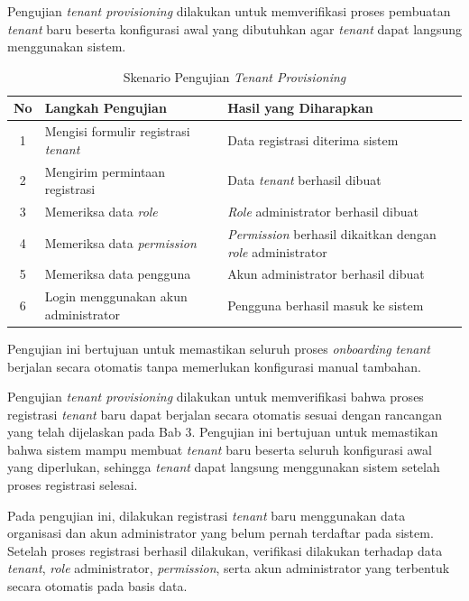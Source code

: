 Pengujian \textit{tenant provisioning} dilakukan untuk memverifikasi proses pembuatan \textit{tenant} baru beserta konfigurasi awal yang dibutuhkan agar \textit{tenant} dapat langsung menggunakan sistem.

\begin{table}[H]
  \centering
  \caption{Skenario Pengujian \textit{Tenant Provisioning}}
  \label{tab:skenario_pengujian_tenant_provisioning}
  \footnotesize
  \begin{tabular}{|c|p{6cm}|p{6.5cm}|}
    \hline
    \rowcolor[HTML]{EFEFEF}
    \textbf{No} & \textbf{Langkah Pengujian} & \textbf{Hasil yang Diharapkan} \\
    \hline
    1 & Mengisi formulir registrasi \textit{tenant} & Data registrasi diterima sistem \\
    \hline
    2 & Mengirim permintaan registrasi & Data \textit{tenant} berhasil dibuat \\
    \hline
    3 & Memeriksa data \textit{role} & \textit{Role} administrator berhasil dibuat \\
    \hline
    4 & Memeriksa data \textit{permission} & \textit{Permission} berhasil dikaitkan dengan \textit{role} administrator \\
    \hline
    5 & Memeriksa data pengguna & Akun administrator berhasil dibuat \\
    \hline
    6 & Login menggunakan akun administrator & Pengguna berhasil masuk ke sistem \\
    \hline
  \end{tabular}
\end{table}

Pengujian ini bertujuan untuk memastikan seluruh proses \textit{onboarding} \textit{tenant} berjalan secara otomatis tanpa memerlukan konfigurasi manual tambahan.

Pengujian \textit{tenant provisioning} dilakukan untuk memverifikasi bahwa proses registrasi \textit{tenant} baru dapat berjalan secara otomatis sesuai dengan rancangan yang telah dijelaskan pada Bab 3. Pengujian ini bertujuan untuk memastikan bahwa sistem mampu membuat \textit{tenant} baru beserta seluruh konfigurasi awal yang diperlukan, sehingga \textit{tenant} dapat langsung menggunakan sistem setelah proses registrasi selesai.

Pada pengujian ini, dilakukan registrasi \textit{tenant} baru menggunakan data organisasi dan akun administrator yang belum pernah terdaftar pada sistem. Setelah proses registrasi berhasil dilakukan, verifikasi dilakukan terhadap data \textit{tenant}, \textit{role} administrator, \textit{permission}, serta akun administrator yang terbentuk secara otomatis pada basis data.

